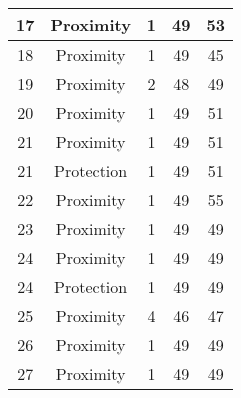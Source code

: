 \documentclass[results.tex]{subfiles}
\begin{document}
\begin{center}
\begin{tabular}{| c || c | c | c | c |}
            \hline
            17                      & Proximity                    & 1                      & 49                      & 53                   \\
            \hline
            18                      & Proximity                    & 1                      & 49                      & 45                   \\
            \hline
            19                      & Proximity                    & 2                      & 48                      & 49                   \\
            \hline
            20                      & Proximity                    & 1                      & 49                      & 51                   \\
            \hline
            21                      & Proximity                    & 1                      & 49                      & 51                   \\
            \hline
            21                      & Protection                   & 1                      & 49                      & 51                   \\
            \hline
            22                      & Proximity                    & 1                      & 49                      & 55                   \\
            \hline
            23                      & Proximity                    & 1                      & 49                      & 49                   \\
            \hline
            24                      & Proximity                    & 1                      & 49                      & 49                   \\
            \hline
            24                      & Protection                   & 1                      & 49                      & 49                   \\
            \hline
            25                      & Proximity                    & 4                      & 46                      & 47                   \\
            \hline
            26                      & Proximity                    & 1                      & 49                      & 49                   \\
            \hline
            27                      & Proximity                    & 1                      & 49                      & 49                   \\

\end{tabular}
\end{center}
\end{document}
